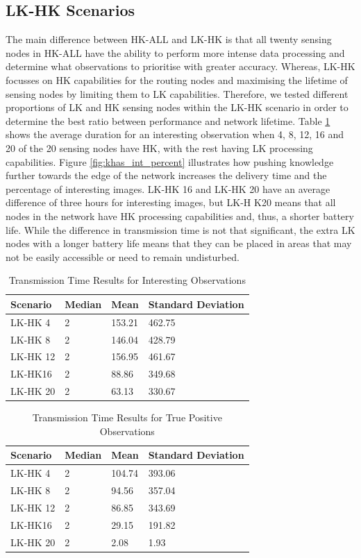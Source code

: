 \subsection{LK-HK Scenarios}

The main difference between HK-ALL and LK-HK is that all twenty sensing nodes in HK-ALL have the ability to perform more intense data processing and determine what observations to prioritise with greater accuracy. Whereas, LK-HK focusses on HK capabilities for the routing nodes and maximising the lifetime of sensing nodes by limiting them to LK capabilities. Therefore, we tested different proportions of LK and HK sensing nodes within the LK-HK scenario in order to determine the best ratio between performance and network lifetime. Table \ref{tab:khas_int} shows the average duration for an interesting observation when 4, 8, 12, 16 and 20 of the 20 sensing nodes have HK, with the rest having LK processing capabilities. Figure \ref{fig:khas_int_percent} illustrates how pushing knowledge further towards the edge of the network increases the delivery time and the percentage of interesting images. LK-HK 16 and LK-HK 20 have an average difference of three hours for interesting images, but LK-H K20 means that all nodes in the network have HK processing capabilities and, thus, a shorter battery life. While the difference in transmission time is not that significant, the extra LK nodes with a longer battery life means that they can be placed in areas that may not be easily accessible or need to remain undisturbed.

\begin{table}[h]\footnotesize
\begin{tabularx}{\textwidth}{ |X|X|X|X|}
\hline
Scenario & Median & Mean & Standard Deviation \\
\hline
LK-HK 4 & 2 & 153.21 & 462.75 \\
LK-HK 8 & 2 & 146.04 & 428.79 \\
LK-HK 12 & 2 & 156.95 & 461.67 \\
LK-HK16 & 2 & 88.86 & 349.68 \\
LK-HK 20 & 2 & 63.13 & 330.67 \\
\hline
\end{tabularx}
\caption{Transmission Time Results for Interesting Observations}\label{tab:khas_int}
\end{table}

\begin{table}[h]\footnotesize
\begin{tabularx}{\textwidth}{ |X|X|X|X|}
\hline
Scenario & Median & Mean & Standard Deviation \\
\hline
LK-HK 4 & 2 & 104.74 & 393.06 \\
LK-HK 8 & 2 & 94.56 & 357.04 \\
LK-HK 12 & 2 & 86.85 & 343.69 \\
LK-HK16 & 2 & 29.15 & 191.82 \\
LK-HK 20 & 2 & 2.08 & 1.93 \\
\hline
\end{tabularx}
\caption{Transmission Time Results for True Positive Observations}\label{tab:khas_tp}
\end{table}

